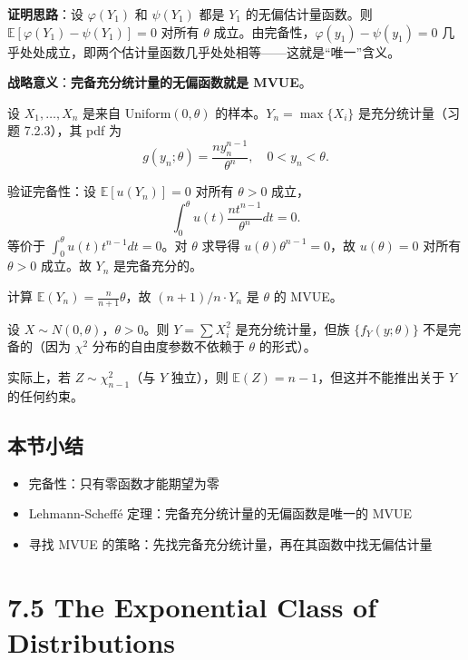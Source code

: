 \textbf{证明思路}：设 $\varphi(Y_1)$ 和 $\psi(Y_1)$ 都是 $Y_1$ 的无偏估计量函数。则 $\mathbb{E}[\varphi(Y_1) - \psi(Y_1)] = 0$ 对所有 $\theta$ 成立。由完备性，$\varphi(y_1) - \psi(y_1) = 0$ 几乎处处成立，即两个估计量函数几乎处处相等——这就是``唯一''含义。

\textbf{战略意义}：\textbf{完备充分统计量的无偏函数就是 MVUE}。

\begin{example}\label{ex:uniform-max-mvue}
设 $X_1, \ldots, X_n$ 是来自 Uniform$(0, \theta)$ 的样本。$Y_n = \max\{X_i\}$ 是充分统计量（习题 7.2.3），其 pdf 为
\[
g(y_n; \theta) = \frac{n y_n^{n-1}}{\theta^n},\quad 0 < y_n < \theta.
\]

验证完备性：设 $\mathbb{E}[u(Y_n)] = 0$ 对所有 $\theta > 0$ 成立，
\[
\int_0^\theta u(t) \frac{n t^{n-1}}{\theta^n} dt = 0.
\]
等价于 $\int_0^\theta u(t) t^{n-1} dt = 0$。对 $\theta$ 求导得 $u(\theta)\theta^{n-1} = 0$，故 $u(\theta) = 0$ 对所有 $\theta > 0$ 成立。故 $Y_n$ 是完备充分的。

计算 $\mathbb{E}(Y_n) = \frac{n}{n+1}\theta$，故 $(n+1)/n \cdot Y_n$ 是 $\theta$ 的 MVUE。
\end{example}

\begin{example}[非完备的情况]\label{ex:not-complete}
设 $X \sim N(0, \theta)$，$\theta > 0$。则 $Y = \sum X_i^2$ 是充分统计量，但族 $\{f_Y(y; \theta)\}$ 不是完备的（因为 $\chi^2$ 分布的自由度参数不依赖于 $\theta$ 的形式）。

实际上，若 $Z \sim \chi^2_{n-1}$（与 $Y$ 独立），则 $\mathbb{E}(Z) = n-1$，但这并不能推出关于 $Y$ 的任何约束。
\end{example}

\subsection*{本节小结}

\begin{itemize}
\item 完备性：只有零函数才能期望为零
\item Lehmann-Scheffé 定理：完备充分统计量的无偏函数是唯一的 MVUE
\item 寻找 MVUE 的策略：先找完备充分统计量，再在其函数中找无偏估计量
\end{itemize}

\section{7.5 The Exponential Class of Distributions}\label{sec:7.5}

